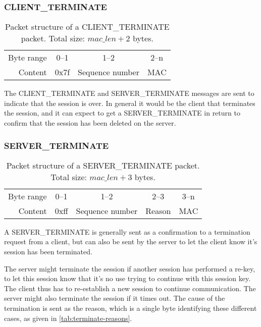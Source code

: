         \subsubsection{CLIENT\_TERMINATE}

\begin{table}[ht!]
\centering
    \begin{tabular}{r | c | c | c |}
    \cline{2-4}
    Byte range & 0--1 & 1--2 & 2--n \\ \cline{2-4}
    Content & 0x7f & Sequence number & MAC \\ \cline{2-4}
    \end{tabular}
    \caption{Packet structure of a CLIENT\_TERMINATE packet. Total size: \( mac\_len + 2 \) bytes.}
\end{table}

The CLIENT\_TERMINATE and SERVER\_TERMINATE messages are sent to indicate that the session is over. In general it would be the client that terminates the session, and it can expect to get a SERVER\_TERMINATE in return to confirm that the session has been deleted on the server.


        \subsubsection{SERVER\_TERMINATE}

\begin{table}[ht!]
\centering
    \begin{tabular}{r | c | c | c | c |}
    \cline{2-5}
    Byte range & 0--1 & 1--2 & 2--3 & 3--n \\ \cline{2-5}
    Content & 0xff & Sequence number & Reason & MAC \\ \cline{2-5}
    \end{tabular}
    \caption{Packet structure of a SERVER\_TERMINATE packet. Total size: \( mac\_len + 3 \) bytes.}
\end{table}

A SERVER\_TERMINATE is generally sent as a confirmation to a termination request from a client, but can also be sent by the server to let the client know it's session has been terminated.

The server might terminate the session if another session has performed a re-key, to let this session know that it's no use trying to continue with this session key. The client thus has to re-establish a new session to continue communication. The server might also terminate the session if it times out. The cause of the termination is sent as the reason, which is a single byte identifying these different cases, as given in \autoref{tab:terminate-reasons}.

